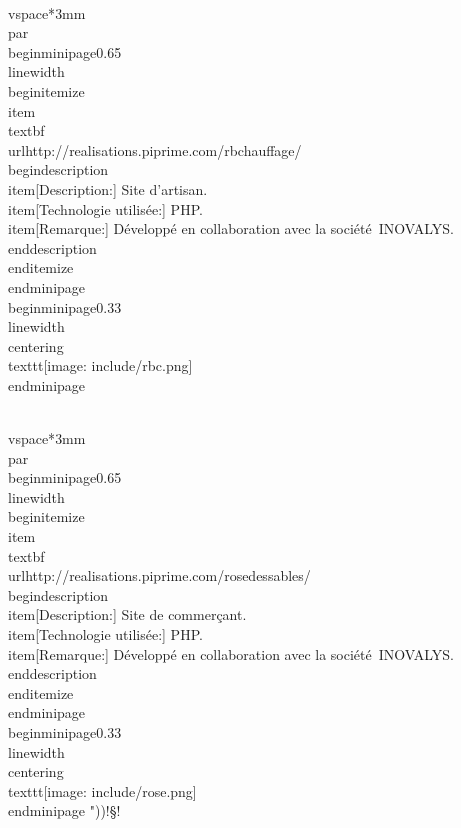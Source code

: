 \documentclass[]{extarticle}
\begin{document}
\\vspace*{3mm}\\par
\\begin{minipage}{0.65\\linewidth}
  \\begin{itemize}
  \\item \\textbf{\\url{http://realisations.piprime.com/rbchauffage/}}
    \\begin{description}
    \\item[Description:] Site d'artisan.
    \\item[Technologie utilisée:] PHP.
    \\item[Remarque:] Développé en collaboration avec la société~INOVALYS.
    \\end{description}
  \\end{itemize}
\\end{minipage}
\\begin{minipage}{0.33\\linewidth}
  \\centering
  \\texttt{[image: include/rbc.png]}
\\end{minipage}


\\vspace*{3mm}\\par
\\begin{minipage}{0.65\\linewidth}
  \\begin{itemize}
  \\item \\textbf{\\url{http://realisations.piprime.com/rosedessables/}}
    \\begin{description}
    \\item[Description:] Site de commerçant.
    \\item[Technologie utilisée:] PHP.
    \\item[Remarque:] Développé en collaboration avec la société~INOVALYS.
    \\end{description}
  \\end{itemize}
\\end{minipage}
\\begin{minipage}{0.33\\linewidth}
  \\centering
  \\texttt{[image: include/rose.png]}
\\end{minipage}
"))!§!
\end{document}
